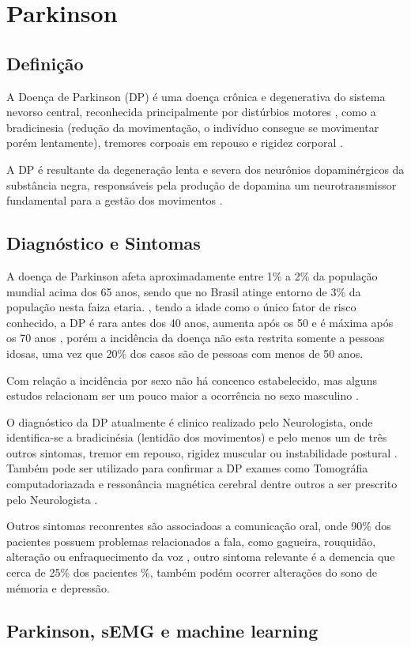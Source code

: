 \chapter{Parkinson}
\section{Definição}
A Doença de Parkinson (DP) é uma doença crônica e degenerativa do sistema nevorso central, reconhecida principalmente por distúrbios motores \cite{souzametodos}, como a bradicinesia (redução da movimentação, o indivíduo consegue se movimentar porém lentamente), tremores corpoais em repouso e rigidez corporal \cite{da2016aspectos}. 

A DP é resultante da degeneração lenta e severa dos neurônios dopaminérgicos da substância negra, responsáveis pela produção de dopamina um neurotransmissor fundamental para a gestão dos movimentos \cite{eftaxias2015detection}.

\section{Diagnóstico e Sintomas}
A doença de Parkinson afeta aproximadamente entre 1\% a 2\% da população mundial acima dos 65 anos, sendo que no Brasil atinge entorno de 3\% da população nesta faiza etaria. \cite{magalhaes2009descobrindo}, tendo a idade como o único fator de risco conhecido, a DP é rara antes dos 40 anos, aumenta após os 50 e é máxima após os 70 anos \cite{peixinho2006alteraccoes}, porém a incidência da doença não esta restrita somente a pessoas idosas, uma vez que 20\% dos casos são de pessoas com menos de 50 anos. \cite{gago2014manual}

Com relação a incidência por sexo não há concenco estabelecido, mas alguns estudos relacionam ser um pouco maior a ocorrência no sexo masculino \cite{peixinho2006alteraccoes}.

O diagnóstico da DP atualmente é clinico realizado pelo Neurologista, onde identifica-se a bradicinésia (lentidão dos movimentos) e pelo menos um de três outros sintomas, tremor em repouso, rigidez muscular ou instabilidade postural \cite{gago2014manual}. Também pode ser utilizado para confirmar a DP exames como Tomográfia computadoriazada e ressonância magnética cerebral dentre outros a ser prescrito pelo Neurologista \cite{gago2014manual}.

Outros sintomas reconrentes são associadoas a comunicação oral, onde 90\% dos pacientes possuem problemas relacionados a fala, como gagueira, rouquidão, alteração ou enfraquecimento da voz \cite{zarzur2010laryngeal}, outro sintoma relevante é a demencia que cerca de 25\% dos pacientes \cite{pamplona1996demencia}\%, também podém ocorrer alterações do sono de mémoria e depressão\cite{barbosa2005parkinsons}.


\section{Parkinson, sEMG e machine learning}